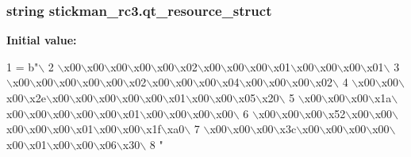 \hypertarget{namespacestickman__rc3_a82c5bd00f7189c0ff60f9f265fc5cd4c}{}
\subsubsection[{qt\+\_\+resource\+\_\+struct}]{\setlength{\rightskip}{0pt plus 5cm}string stickman\+\_\+rc3.\+qt\+\_\+resource\+\_\+struct}\label{namespacestickman__rc3_a82c5bd00f7189c0ff60f9f265fc5cd4c}
{\bfseries Initial value\+:}
\begin{DoxyCode}
1 = b\textcolor{stringliteral}{"\(\backslash\)}
2 \textcolor{stringliteral}{\(\backslash\)x00\(\backslash\)x00\(\backslash\)x00\(\backslash\)x00\(\backslash\)x00\(\backslash\)x02\(\backslash\)x00\(\backslash\)x00\(\backslash\)x00\(\backslash\)x01\(\backslash\)x00\(\backslash\)x00\(\backslash\)x00\(\backslash\)x01\(\backslash\)}
3 \textcolor{stringliteral}{\(\backslash\)x00\(\backslash\)x00\(\backslash\)x00\(\backslash\)x00\(\backslash\)x00\(\backslash\)x02\(\backslash\)x00\(\backslash\)x00\(\backslash\)x00\(\backslash\)x04\(\backslash\)x00\(\backslash\)x00\(\backslash\)x00\(\backslash\)x02\(\backslash\)}
4 \textcolor{stringliteral}{\(\backslash\)x00\(\backslash\)x00\(\backslash\)x00\(\backslash\)x2e\(\backslash\)x00\(\backslash\)x00\(\backslash\)x00\(\backslash\)x00\(\backslash\)x00\(\backslash\)x01\(\backslash\)x00\(\backslash\)x00\(\backslash\)x05\(\backslash\)x20\(\backslash\)}
5 \textcolor{stringliteral}{\(\backslash\)x00\(\backslash\)x00\(\backslash\)x00\(\backslash\)x1a\(\backslash\)x00\(\backslash\)x00\(\backslash\)x00\(\backslash\)x00\(\backslash\)x00\(\backslash\)x01\(\backslash\)x00\(\backslash\)x00\(\backslash\)x00\(\backslash\)x00\(\backslash\)}
6 \textcolor{stringliteral}{\(\backslash\)x00\(\backslash\)x00\(\backslash\)x00\(\backslash\)x52\(\backslash\)x00\(\backslash\)x00\(\backslash\)x00\(\backslash\)x00\(\backslash\)x00\(\backslash\)x01\(\backslash\)x00\(\backslash\)x00\(\backslash\)x1f\(\backslash\)xa0\(\backslash\)}
7 \textcolor{stringliteral}{\(\backslash\)x00\(\backslash\)x00\(\backslash\)x00\(\backslash\)x3c\(\backslash\)x00\(\backslash\)x00\(\backslash\)x00\(\backslash\)x00\(\backslash\)x00\(\backslash\)x01\(\backslash\)x00\(\backslash\)x00\(\backslash\)x06\(\backslash\)x30\(\backslash\)}
8 \textcolor{stringliteral}{"}
\end{DoxyCode}
